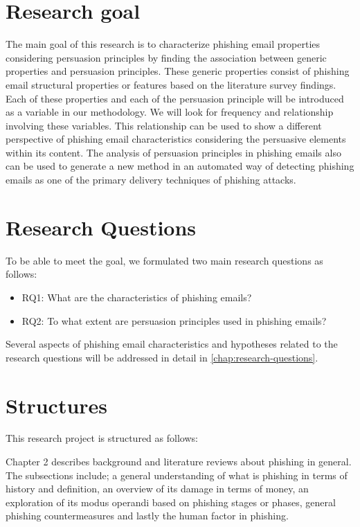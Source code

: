 \section{Research goal}

The main goal of this research is to characterize phishing email properties
considering persuasion principles by finding the association between
generic properties and persuasion principles. These generic properties
consist of phishing email structural properties or features based
on the literature survey findings. Each of these properties and each
of the persuasion principle will be introduced as a variable in our
methodology. We will look for frequency and relationship involving
these variables. This relationship can be used to show a different
perspective of phishing email characteristics considering the persuasive
elements within its content. The analysis of persuasion principles
in phishing emails also can be used to generate a new method in an
automated way of detecting phishing emails as one of the primary delivery
techniques of phishing attacks.


\section{Research Questions}

To be able to meet the goal, we formulated two main research questions
as follows:
\begin{itemize}
\item RQ1: What are the characteristics of phishing emails?
\item RQ2: To what extent are persuasion principles used in phishing emails?
\end{itemize}
%
Several aspects of phishing email characteristics and hypotheses related
to the research questions will be addressed in detail in \autoref{chap:research-questions}.

%

\section{Structures}

This research project is structured as follows: 

Chapter 2 describes background and literature reviews about phishing
in general. The subsections include; a general understanding of what
is phishing in terms of history and definition, an overview of its
damage in terms of money, an exploration of its modus operandi based
on phishing stages or phases, general phishing countermeasures and
lastly the human factor in phishing. 

